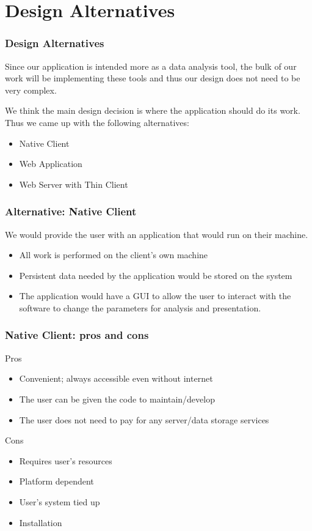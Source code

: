 \documentclass{beamer}
\begin{document}
\section{Design Alternatives}
\begin{frame}
\frametitle{Design Alternatives}

Since our application is intended more as a data analysis tool, the bulk of our work will be implementing these tools and thus our design does not need to be very complex. \vspace{0.3cm}

We think the main design decision is where the application should do its work. Thus we came up with the following alternatives:
\begin{itemize}
\item Native Client
\item Web Application
\item Web Server with Thin Client
\end{itemize}
\end{frame}

\begin{frame}
\frametitle{Alternative: Native Client}
We would provide the user with an application that would run on their machine. 

\begin{itemize}
\item All work is performed on the client's own machine
\item Persistent data needed by the application would be stored on the system
\item The application would have a GUI to allow the user to interact with the software to change the parameters for analysis and presentation.
\end{itemize}
\end{frame}

\begin{frame}
\frametitle{Native Client: pros and cons}
Pros
\begin{itemize}
\item Convenient; always accessible even without internet
\item The user can be given the code to maintain/develop
\item The user does not need to pay for any server/data storage services
\end{itemize}
Cons
\begin{itemize}
\item Requires user's resources
\item Platform dependent
\item User's system tied up 
\item Installation
\end{itemize}
\end{frame}
\end{document}
